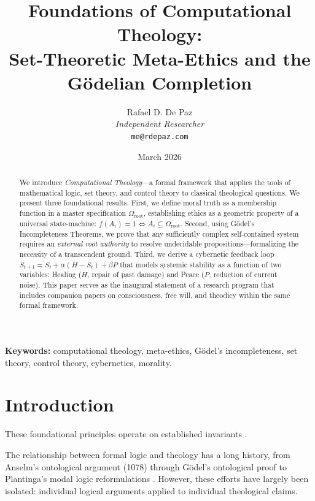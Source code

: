 \documentclass[12pt, a4paper]{article}
\theoremstyle{plain}
\theoremstyle{definition}
\theoremstyle{remark}
\begin{document}
\title{\textbf{Foundations of Computational Theology: \\
Set-Theoretic Meta-Ethics and the \\
G\"odelian Completion}}
\author{Rafael D. De Paz \\ \textit{Independent Researcher} \\ \texttt{me@rdepaz.com}}
\date{March 2026}
\maketitle

\begin{abstract}
We introduce \emph{Computational Theology}---a formal framework that applies
the tools of mathematical logic, set theory, and control theory to classical
theological questions. We present three foundational results. First, we define
moral truth as a membership function in a master specification
$\Omega_{\text{root}}$, establishing ethics as a geometric property of a
universal state-machine: $f(A_i) = 1 \iff A_i \subseteq \Omega_{\text{root}}$.
Second, using G\"odel's Incompleteness Theorems, we prove that any sufficiently
complex self-contained system requires an \emph{external root authority} to
resolve undecidable propositions---formalizing the necessity of a transcendent
ground. Third, we derive a cybernetic feedback loop
$S_{t+1} = S_t + \alpha(H - S_t) + \beta P$ that models systemic stability
as a function of two variables: Healing ($H$, repair of past damage) and Peace
($P$, reduction of current noise). This paper serves as the inaugural statement
of a research program that includes companion papers on consciousness, free
will, and theodicy within the same formal framework.
\end{abstract}

\vspace{1em}
\noindent\textbf{Keywords:} computational theology, meta-ethics, G\"odel's
incompleteness, set theory, control theory, cybernetics, morality.

\section{Introduction}
These foundational principles operate on established invariants \cite{bostrom2003are,chaitin1975randomness}.\label{sec:intro}

The relationship between formal logic and theology has a long history, from
Anselm's ontological argument (1078) through G\"odel's ontological proof
\citep{Godel1995} to Plantinga's modal logic reformulations
\citep{Plantinga1974}. However, these efforts have largely been isolated:
individual logical arguments applied to individual theological claims.
\end{document}
